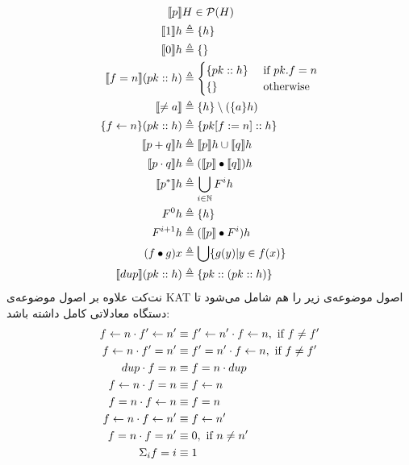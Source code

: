 \begin{align*}
    \llbracket p \rrbracket             & H \in \mathcal{P}({H})                \\
    \llbracket 1 \rrbracket h           & \triangleq \{h\}                            \\
    \llbracket 0 \rrbracket h           & \triangleq \{\}                             \\
    \llbracket f=n \rrbracket(pk::h)    & \triangleq \begin{cases}
                                   \{pk::h\} & \text{ if } pk.f = n \\
                                   \{\}      & \text{ otherwise }
                               \end{cases} \\
    \llbracket \neq a \rrbracket        & \triangleq \{h\} \setminus (\{a\}h)         \\
    \{f \leftarrow n\} (pk::h) & \triangleq \{pk[f:=n]::h\}                  \\
    \llbracket p+q \rrbracket h          & \triangleq \llbracket p \rrbracket h \cup \llbracket q \rrbracket h           \\
    \llbracket p\cdot q \rrbracket h    & \triangleq (\llbracket p \rrbracket \bullet \llbracket q \rrbracket) h      \\
    \llbracket p^* \rrbracket h          & \triangleq \bigcup_{i \in \mathbb{N}}F^i h  \\
    F^0 h               & \triangleq \{h\}                            \\
    F^{i+1} h           & \triangleq (\llbracket p \rrbracket \bullet F^i) h          \\
    (f \bullet g) x     & \triangleq \bigcup\{g(y)|y \in f(x)\}       \\
    \llbracket dup \rrbracket (pk::h)   & \triangleq \{pk::(pk::h)\}
\end{align*}
نت‌کت علاوه بر اصول موضوعه‌ی
KAT
اصول‌ موضوعه‌ی زیر را هم شامل می‌شود تا دستگاه معادلاتی کامل داشته باشد:
\begin{align}
    f \leftarrow n \cdot f' \leftarrow n' & \equiv f' \leftarrow n' \cdot f \leftarrow n,
    \text{ if } f \neq f' \label{mod-mod-comm}
    \\
    f \leftarrow n \cdot f' = n'   & \equiv f' = n' \cdot f \leftarrow n,
    \text{ if } f \neq f' \label{mod-filter-comm}                            \\
    dup \cdot f = n         & \equiv f = n \cdot dup \label{dup-filter-comm} \\
    f \leftarrow n \cdot f = n     & \equiv f \leftarrow n \label{mod-filter}              \\
    f = n \cdot f \leftarrow n     & \equiv f = n \label{filter-mod}                \\
    f \leftarrow n \cdot f \leftarrow n'  & \equiv f \leftarrow n' \label{mod-mod}                \\
    f = n \cdot f = n'      & \equiv 0, \text{ if } n \neq n' \label{contra} \\
    \Sigma_{i} f = i        & \equiv 1 \label{match-all}
\end{align}
